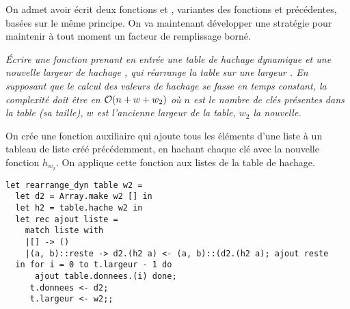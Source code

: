 \medskip

On admet avoir écrit deux fonctions  et
, variantes des fonctions  et
 précédentes, basées sur le même principe. On va maintenant
développer une stratégie pour maintenir à tout moment un facteur de
remplissage borné.
\begin{Exercise}\it
Écrire une fonction  prenant en entrée une
table de hachage dynamique et une nouvelle largeur de hachage ,
qui réarrange la table sur une largeur . En supposant que le
calcul des valeurs de hachage se fasse en temps constant, la complexité
doit être en ${\cal O}(n+w+w_2)$ où $n$ est le nombre de clés présentes dans la
table (sa taille), $w$ est l’ancienne largeur de la table, $w_2$ la
nouvelle.
\end{Exercise}
\begin{Answer}
On crée une fonction auxiliaire  qui ajoute tous les éléments d'une liste à un tableau de liste créé précédemment, en hachant chaque clé avec la nouvelle fonction $h_{w_2}$. 
On applique cette fonction aux listes de la table de hachage. 

\begin{lstlisting}
let rearrange_dyn table w2 =
  let d2 = Array.make w2 [] in
  let h2 = table.hache w2 in
  let rec ajout liste = 
    match liste with
    |[] -> ()
    |(a, b)::reste -> d2.(h2 a) <- (a, b)::(d2.(h2 a); ajout reste
  in for i = 0 to t.largeur - 1 do
      ajout table.donnees.(i) done;
     t.donnees <- d2;
     t.largeur <- w2;;
\end{lstlisting}
\end{Answer}

\medskip

